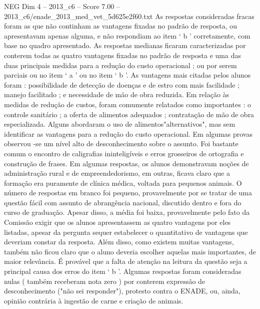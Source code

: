 \begin{textsample}{NEG Dim 4 – 2013\_c6 – Score 7.00 – 2013\_c6/enade\_2013\_med\_vet\_5d625e2f60.txt}
As respostas consideradas fracas foram as que não continham as vantagens fixadas no padrão de resposta, ou apresentavam apenas alguma, e não respondiam ao item ‘ b ’ corretamente, com base no quadro apresentado.
As respostas medianas ficaram caracterizadas por conterem todas as quatro vantagens fixadas no padrão de resposta e uma das duas principais medidas para a redução do custo operacional ; ou por serem parciais ou no item ‘ a ’ ou no item ‘ b ’.
As vantagens mais citadas pelos alunos foram : possibilidade de detecção de doenças e de estro com mais facilidade ; manejo facilitado ; e necessidade de mão de obra reduzida.
Em relação às medidas de redução de custos, foram comumente relatados como importantes : o controle sanitário ; a oferta de alimentos adequados ; contratação de mão de obra especializada.
Alguns abordaram o uso de alimentos"alternativos", mas sem identificar as vantagens para a redução do custo operacional.
Em algumas provas observou -se um nível alto de desconhecimento sobre o assunto.
Foi bastante comum o encontro de caligrafias ininteligíveis e erros grosseiros de ortografia e construção de frases.
Em algumas respostas, os alunos demonstravam noções de administração rural e de empreendedorismo, em outras, ficava claro que a formação era puramente de clínica médica, voltada para pequenos animais.
O número de respostas em branco foi pequeno, provavelmente por se tratar de uma questão fácil com assunto de abrangência nacional, discutido dentro e fora do curso de graduação.
Apesar disso, a média foi baixa, provavelmente pelo fato da Comissão exigir que os alunos apresentassem as quatro vantagens por eles listadas, apesar da pergunta sequer estabelecer o quantitativo de vantagens que deveriam constar da resposta.
Além disso, como existem muitas vantagens, também não ficou claro que o aluno deveria escolher aquelas mais importantes, de maior relevância.
É provável que a falta de atenção na leitura da questão seja a principal causa dos erros do item ‘ b ’.
Algumas respostas foram consideradas nulas ( também receberam nota zero ) por conterem expressão de desconhecimento ("não sei responder"), protesto contra o ENADE, ou, ainda, opinião contrária à ingestão de carne e criação de animais.

\end{textsample}
